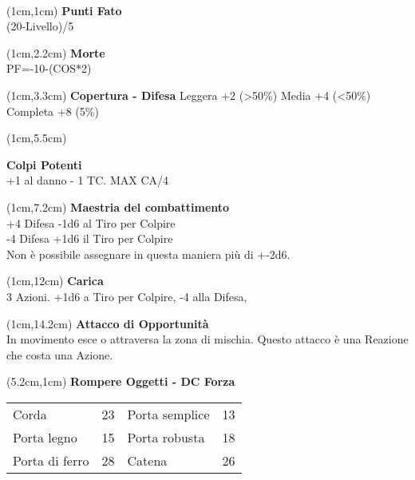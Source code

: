 \documentclass[a4paper,12 pt,openany]{book}
\begin{document}
~\newpage

\begin{textblock*}{4cm}(1cm,1cm) %
	{\textbf{Punti Fato}\\
	(20-Livello)/5}
\end{textblock*}

	\begin{textblock*}{4cm}(1cm,2.2cm) %
		{\textbf{Morte}\\
			PF=-10-(COS*2)}
	\end{textblock*}

\begin{textblock*}{4cm}(1cm,3.3cm) %
\textbf{Copertura - Difesa}
Leggera +2 (>50\%)
Media +4 (<50\%)
Completa +8 (5\%)
	\end{textblock*}

\begin{textblock*}{4cm}(1cm,5.5cm) %

\textbf{Colpi Potenti}\\
+1 al danno - 1 TC. MAX CA/4

	\end{textblock*}

\begin{textblock*}{4cm}(1cm,7.2cm) %
\textbf{Maestria del combattimento}\\
+4 Difesa -1d6 al Tiro per Colpire\\
-4 Difesa +1d6 il Tiro per Colpire \\
Non è possibile assegnare in questa maniera più di +-2d6.
	\end{textblock*}


\begin{textblock*}{4cm}(1cm,12cm) %
\textbf{Carica}\\
3 Azioni. +1d6 a Tiro per Colpire, -4 alla Difesa,
\end{textblock*}

\begin{textblock*}{4cm}(1cm,14.2cm) %
	\textbf{Attacco di Opportunità}\\
In movimento esce o attraversa la zona di mischia.
Questo attacco è una Reazione che costa una Azione.
\end{textblock*}


\begin{textblock*}{8.5cm}(5.2cm,1cm) %
	\textbf{Rompere Oggetti - DC Forza}\\
	\begin{tabular}{ll|ll}
		Corda   		   & 23&	Porta semplice         & 13\\
		Porta legno        & 15&	Porta robusta          & 18\\
		Porta di ferro     & 28&	Catena                 & 26 \\
	\end{tabular}

\end{textblock*}
\end{document}
